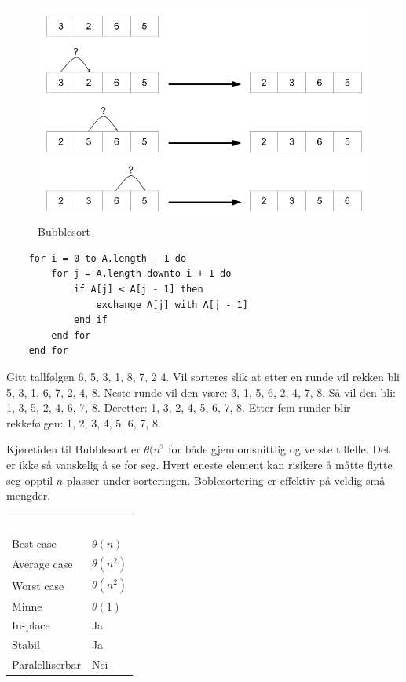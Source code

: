 \begin{figure}[H]
\includegraphics[scale=0.5]{images/bubblesort}
\centering %
\caption{Bubblesort}
\label{fig:bubblesort}
\end{figure}

\begin{lstlisting}
    for i = 0 to A.length - 1 do
    	for j = A.length downto i + 1 do
		    if A[j] < A[j - 1] then
		    	exchange A[j] with A[j - 1]
		    end if
	    end for
    end for
\end{lstlisting}

\begin{boxed}
Gitt tallfølgen 6, 5, 3, 1, 8, 7, 2 4. Vil sorteres slik at etter en runde vil rekken bli 5, 3, 1, 6, 7, 2, 4, 8. Neste runde vil den være: 3, 1, 5, 6, 2, 4, 7, 8. Så vil den bli: 1, 3, 5, 2, 4, 6, 7, 8. Deretter: 1, 3, 2, 4, 5, 6, 7, 8. Etter fem runder blir rekkefølgen: 1, 2, 3, 4, 5, 6, 7, 8.
\end{boxed}

\noindent Kjøretiden til Bubblesort er \textbf{$\theta(n^2$} for både gjennomsnittlig og verste tilfelle. Det er ikke så vanskelig å se for seg. Hvert eneste element kan risikere å måtte flytte seg opptil $n$ plasser under sorteringen. Boblesortering er effektiv på veldig små mengder.

\begin{table}[H]
    \label{tab:bubblesort}
    \centering
    \begin{tabular}{|L{15em} | L{15em}|}
        \hline
        \textbf{\textcolor{white}{Tilfelle}} & \textbf{\textcolor{white}{}}\\
        Best case & $\theta(n)$\\
        Average case & $\theta(n^2)$\\
        Worst case & $\theta(n^2)$\\
        Minne & $\theta(1)$\\
        In-place & Ja\\
        Stabil & Ja\\
        Paralelliserbar & Nei\\
         \hline
    \end{tabular}
\end{table}

